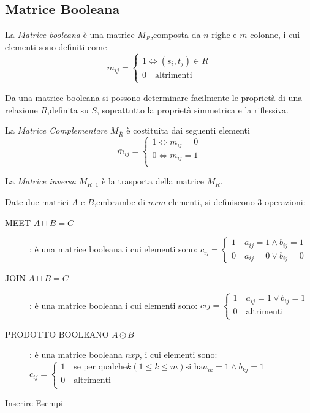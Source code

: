 \subsection{Matrice Booleana}
La \emph{Matrice booleana} è una matrice $M_R$,composta da $n$ righe e $m$ colonne,
i cui elementi sono definiti come
\begin{equation*}
    m_{ij} = \begin{cases} 1 \iff (s_i,t_j) \in R \\
                           0 \quad \text{altrimenti} \\
             \end{cases}
\end{equation*}


Da una matrice booleana si possono determinare facilmente le proprietà
di una relazione $R$,definita su $S$, soprattutto la proprietà simmetrica e la riflessiva.

La \emph{Matrice Complementare} $M_{\bar{R}}$ è costituita dai seguenti elementi
\begin{equation*}
    \bar{m}_{ij} = \begin{cases} 1 \iff m_{ij} = 0 \\
                                 0 \iff m_{ij} = 1 \\
                   \end{cases}
\end{equation*}

La \emph{Matrice inversa} $M_{R ^-1}$ è la trasporta della matrice $M_R$.

Date due matrici $A$ e $B$,embrambe di $n x m$ elementi, si definiscono 3 operazioni:
\begin{description}
    \item[MEET $A \sqcap B = C$]: è una matrice booleana i cui elementi sono:\newline
$c_{ij} =  \begin{cases} 1 \quad a_{ij} = 1 \land b_{ij} = 1 \\ 0 \quad a_{ij} = 0 \lor b_{ij} = 0 \end{cases}$
    \item[JOIN $A \sqcup B = C$]: è una matrice booleana i cui elementi sono:\newline
    $c{ij} = \begin{cases} 1 \quad a_{ij} = 1 \lor b_{ij} = 1 \\
                           0 \quad \text{altrimenti}\\ \end{cases}$
    \item[PRODOTTO BOOLEANO $A \odot B$]: è una matrice booleana $n x p$, i cui elementi sono:\newline
    $c_{ij} = \begin{cases} 1 \quad \text{se per qualche} k(1 \leq k \leq m) \text{si ha} a_{ik} = 1 \land b_{kj} = 1\\
                            0 \quad \text{altrimenti} \\ \end{cases}$
\end{description}

Inserire Esempi


